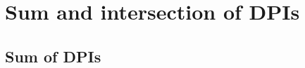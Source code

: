 



\section{Sum and intersection of DPIs}
\label{subsec:dpi-intersection}

\subsection{Sum of DPIs}\label{subsec:dpi-union}

